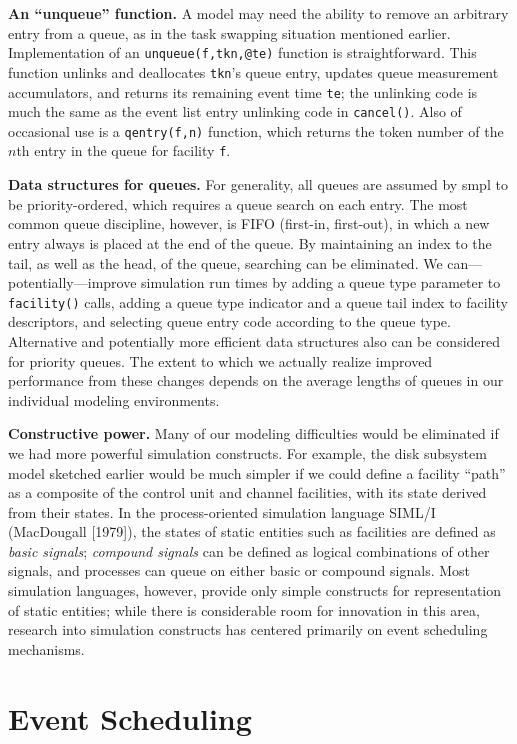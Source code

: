 \textbf{An ``unqueue'' function.} A model may need the ability to remove an
arbitrary entry from a queue, as in the task swapping situation mentioned
earlier. Implementation of an \texttt{unqueue(f,tkn,@te)} function is straightforward.
This function unlinks and deallocates \texttt{tkn}'s queue entry, updates
queue measurement accumulators, and returns its remaining event time \texttt{te};
the unlinking code is much the same as the event list entry unlinking code in
\texttt{cancel()}. Also of occasional use is a \texttt{qentry(f,n)} function, which returns
the token number of the $n$th entry in the queue for facility \texttt{f}.

\textbf{Data structures for queues.} For generality, all queues are assumed by
smpl to be priority-ordered, which requires a queue search on each entry.
The most common queue discipline, however, is FIFO (first-in, first-out), in
which a new entry always is placed at the end of the queue. By maintaining
an index to the tail, as well as the head, of the queue, searching can be eliminated.
We can---potentially---improve simulation run times by adding a
queue type parameter to \texttt{facility()} calls, adding a queue type indicator
and a queue tail index to facility descriptors, and selecting queue entry code
according to the queue type. Alternative and potentially more efficient data
structures also can be considered for priority queues. The extent to which we
actually realize improved performance from these changes depends on the
average lengths of queues in our individual modeling environments.

\textbf{Constructive power.} Many of our modeling difficulties would be eliminated
if we had more powerful simulation constructs. For example, the disk
subsystem model sketched earlier would be much simpler if we could define a
facility ``path'' as a composite of the control unit and channel facilities,
with its state derived from their states. In the process-oriented simulation
language SIML/I (MacDougall [1979]), the states of static entities such as
facilities are defined as \emph{basic signals}; \emph{compound signals} can be defined as
logical combinations of other signals, and processes can queue on either basic
or compound signals. Most simulation languages, however, provide only
simple constructs for representation of static entities; while there is
considerable room for innovation in this area, research into simulation
constructs has centered primarily on event scheduling mechanisms.

\section{Event Scheduling}

